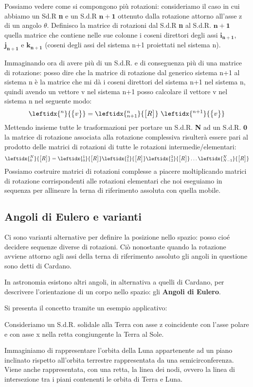 Possiamo vedere come si compongono più rotazioni: consideriamo il caso in cui abbiamo un Sd.R \textbf{n} e un S.d.R $\mathbf{n+1}$ ottenuto dalla rotazione attorno all'asse z di un angolo $\theta$. Definisco la matrice di rotazioni dal S.d.R \textbf{n} al S.d.R. $\mathbf{n+1}$ quella matrice che contiene nelle sue colonne i coseni direttori degli assi $\mathbf{i_{n+1}}$, $\mathbf{j_{n+1}}$ e $\mathbf{k_{n+1}}$ (coseni degli assi del sistema n+1 proiettati nel sistema n).
 
Immaginando ora di avere più di un S.d.R. e di conseguenza più di una matrice di rotazione: posso dire che la matrice di rotazione dal generico sistema n+1 al sistema n è la matrice che mi dà i coseni direttori del sistema n+1 nel sistema n, quindi avendo un vettore v nel sistema n+1 posso calcolare il vettore v nel sistema n nel seguente modo:
 \[\leftidx{^n}{\B{v}} = \leftidx{_{n+1}^n}{\M{R}}\,\,\leftidx{^{n+1}}{\B{v}}\]
 Mettendo insieme tutte le trasformazioni per portare un S.d.R. \textbf{N} ad un S.d.R. $\mathbf{0}$ la matrice di rotazione associata alla rotazione complessiva risulterà essere pari al prodotto delle matrici di rotazioni di tutte le rotazioni intermedie/elementari:
 \[\leftidx{^N_0}{\M{R}} = \leftidx{^1_0}{\M{R}}\leftidx{^2_1}{\M{R}}\leftidx{^3_2}{\M{R}}\dots \leftidx{^N_{N-1}}{\M{R}}\]
 Possiamo costruire matrici di rotazioni complesse a piacere moltiplicando matrici di rotazione corrispondenti alle rotazioni elementari che noi eseguiamo in sequenza per allineare la terna di riferimento assoluta con quella mobile.
 
 \subsection{Angoli di Eulero e varianti}
 Ci sono varianti alternative per definire la posizione nello spazio: posso cioé decidere sequenze diverse di rotazioni. Ciò nonostante quando la rotazione avviene attorno agli assi della terna di riferimento assoluto gli angoli in questione sono detti di Cardano.

In astronomia esistono altri angoli, in alternativa a quelli di Cardano, per descrivere l'orientazione di un corpo nello spazio: gli \textbf{Angoli di Eulero}.

Si presenta il concetto tramite un esempio applicativo:

Consideriamo un S.d.R. solidale alla Terra con asse z coincidente con l'asse polare e con asse x nella retta congiungente la Terra al Sole.

Immaginiamo di rappresentare l'orbita della Luna appartenente ad un piano inclinato rispetto all'orbita terrestre rappresentata da una semicirconferenza. Viene anche rappresentata, con una retta, la linea dei nodi, ovvero la linea di intersezione tra i piani contenenti le orbita di Terra e Luna.

